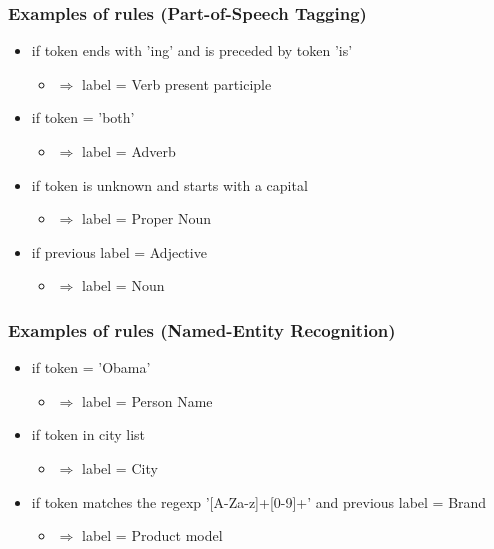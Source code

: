 \documentclass[usenames,dvipsnames]{beamer}
\begin{document}
\begin{frame}\frametitle{Examples of rules (Part-of-Speech Tagging)}

\begin{itemize}
\item if token ends with 'ing' and is preceded by token 'is'
\begin{itemize}
\item $\Rightarrow$ label = Verb present participle
\end{itemize}
\item if token = 'both'
\begin{itemize}
\item $\Rightarrow$ label = Adverb
\end{itemize}
\item if token is unknown and starts with a capital
\begin{itemize}
\item $\Rightarrow$  label = Proper Noun
\end{itemize}
\item if previous label = Adjective
\begin{itemize}
\item $\Rightarrow$ label = Noun
\end{itemize}
\end{itemize}

\end{frame}


\begin{frame}\frametitle{Examples of rules (Named-Entity Recognition)}

\begin{itemize}
\item if token = 'Obama'
\begin{itemize}
\item $\Rightarrow$ label = Person Name
\end{itemize}
\item if token in city list
\begin{itemize}
\item $\Rightarrow$ label = City
\end{itemize}
\item if token matches the regexp '[A-Za-z]+[0-9]+' and previous label
  = Brand
\begin{itemize}
\item $\Rightarrow$ label = Product model
\end{itemize}
\end{itemize}

\end{frame}
\end{document}
